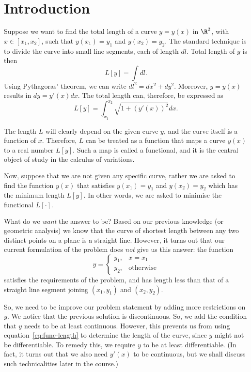 \section{Introduction}
Suppose we want to find the total length of a curve $y=y(x)$ in $\R^2$, with $x \in [x_1,x_2]$, such that $y(x_1)=y_1$ and $y(x_2)=y_2$. The standard technique is to divide the curve into small line segments, each of length $dl$. Total length of $y$ is then
\begin{equation}
  L[y] = \int dl.
\end{equation}
Using Pythagoras' theorem, we can write $dl^2 = dx^2 + dy^2$. Moreover, $y = y(x)$ results in $dy = y'(x) dx$. The total length can, therefore, be expressed as
\begin{equation}
  \label{eq:func-length}
  L[y] = \int_{x_1}^{x_2} \sqrt{1 + \left(y'(x)\right)^2} dx.
\end{equation}

The length $L$ will clearly depend on the given curve $y$, and the curve itself is a function of $x$. Therefore, $L$ can be treated as a function that maps a curve $y(x)$ to a real number $L[y]$. Such a map is called a functional, and it is the central object of study in the calculus of variations.

Now, suppose that we are not given any specific curve, rather we are asked to find the function $y(x)$ that satisfies $y(x_1) = y_1$ and $y(x_2) = y_2$ which has the minimum length $L[y]$. In other words, we are asked to minimise the functional $L[\cdot]$.

What do we \emph{want} the answer to be? Based on our previous knowledge (or geometric analysis) we know that the curve of shortest length between any two distinct points on a plane is a straight line. However, it turns out that our current formulation of the problem does \emph{not} give us this answer: the function
\begin{equation}
  y = \begin{cases}y_1, & x=x_1\\ y_2, & \text{otherwise}\end{cases}
\end{equation}
satisfies the requirements of the problem, and has length less than that of a straight line segment joining $(x_1, y_1)$ and $(x_2, y_2)$.

So, we need to be improve our problem statement by adding more restrictions on $y$. We notice that the previous solution is discontinuous. So, we add the condition that $y$ needs to be at least continuous. However, this prevents us from using equation~\eqref{eq:func-length} to determine the length of the curve, since $y$ might not be differentiable. To remedy this, we require $y$ to be at least differentiable. (In fact, it turns out that we also need $y'(x)$ to be continuous, but we shall discuss such technicalities later in the course.)

